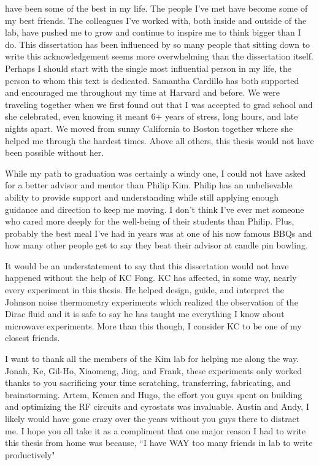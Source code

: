 
 have been some of the best in my life. The people I've met have become some of my best friends. The colleagues I've worked with, both inside and outside of the lab, have pushed me to grow and continue to inspire me to think bigger than I do. This dissertation has been influenced by so many people that sitting down to write this acknowledgement seems more overwhelming than the dissertation itself. Perhaps I should start with the single most influential person in my life, the person to whom this text is dedicated. Samantha Cardillo has both supported and encouraged me throughout my time at Harvard and before. We were traveling together when we first found out that I was accepted to grad school and she celebrated, even knowing it meant 6+ years of stress, long hours, and late nights apart. We moved from sunny California to Boston together where she helped me through the hardest times.  Above all others, this thesis would not have been possible without her. 

While my path to graduation was certainly a windy one, I could not have asked for a better advisor and mentor than Philip Kim. Philip has an unbelievable ability to provide support and understanding while still applying enough guidance and direction to keep me moving. I don't think I've ever met someone who cared more deeply for the well-being of their students than Philip. Plus, probably the best meal I've had in years was at one of his now famous BBQs and how many other people get to say they beat their advisor at candle pin bowling.

It would be an understatement to say that this dissertation would not have happened without the help of KC Fong. KC has affected, in some way, nearly every experiment in this thesis. He helped design, guide, and interpret the Johnson noise thermometry experiments which realized the observation of the Dirac fluid and it is safe to say he has taught me everything I know about microwave experiments. More than this though, I consider KC to be one of my closest friends.

I want to thank all the members of the Kim lab for helping me along the way. Jonah, Ke, Gil-Ho, Xiaomeng, Jing, and Frank, these experiments only worked thanks to you sacrificing your time scratching, transferring, fabricating, and brainstorming. Artem, Kemen and Hugo, the effort you guys spent on building and optimizing the RF circuits and cyrostats was invaluable. Austin and Andy, I likely would have gone crazy over the years without you guys there to distract me. I hope you all take it as a compliment that one major reason I had to write this thesis from home was because, ``I have WAY too many friends in lab to write productively"

